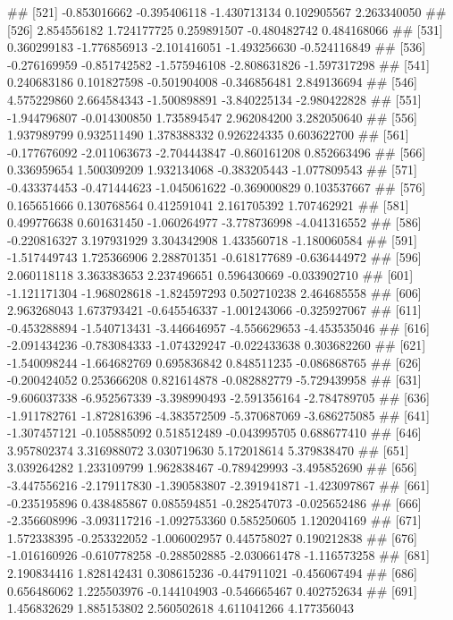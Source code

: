 \documentclass[
]{article}
\begin{document}
\begin{enumerate}[label=(\alph*)]
##  [521] -0.853016662 -0.395406118 -1.430713134  0.102905567  2.263340050
##  [526]  2.854556182  1.724177725  0.259891507 -0.480482742  0.484168066
##  [531]  0.360299183 -1.776856913 -2.101416051 -1.493256630 -0.524116849
##  [536] -0.276169959 -0.851742582 -1.575946108 -2.808631826 -1.597317298
##  [541]  0.240683186  0.101827598 -0.501904008 -0.346856481  2.849136694
##  [546]  4.575229860  2.664584343 -1.500898891 -3.840225134 -2.980422828
##  [551] -1.944796807 -0.014300850  1.735894547  2.962084200  3.282050640
##  [556]  1.937989799  0.932511490  1.378388332  0.926224335  0.603622700
##  [561] -0.177676092 -2.011063673 -2.704443847 -0.860161208  0.852663496
##  [566]  0.336959654  1.500309209  1.932134068 -0.383205443 -1.077809543
##  [571] -0.433374453 -0.471444623 -1.045061622 -0.369000829  0.103537667
##  [576]  0.165651666  0.130768564  0.412591041  2.161705392  1.707462921
##  [581]  0.499776638  0.601631450 -1.060264977 -3.778736998 -4.041316552
##  [586] -0.220816327  3.197931929  3.304342908  1.433560718 -1.180060584
##  [591] -1.517449743  1.725366906  2.288701351 -0.618177689 -0.636444972
##  [596]  2.060118118  3.363383653  2.237496651  0.596430669 -0.033902710
##  [601] -1.121171304 -1.968028618 -1.824597293  0.502710238  2.464685558
##  [606]  2.963268043  1.673793421 -0.645546337 -1.001243066 -0.325927067
##  [611] -0.453288894 -1.540713431 -3.446646957 -4.556629653 -4.453535046
##  [616] -2.091434236 -0.783084333 -1.074329247 -0.022433638  0.303682260
##  [621] -1.540098244 -1.664682769  0.695836842  0.848511235 -0.086868765
##  [626] -0.200424052  0.253666208  0.821614878 -0.082882779 -5.729439958
##  [631] -9.606037338 -6.952567339 -3.398990493 -2.591356164 -2.784789705
##  [636] -1.911782761 -1.872816396 -4.383572509 -5.370687069 -3.686275085
##  [641] -1.307457121 -0.105885092  0.518512489 -0.043995705  0.688677410
##  [646]  3.957802374  3.316988072  3.030719630  5.172018614  5.379838470
##  [651]  3.039264282  1.233109799  1.962838467 -0.789429993 -3.495852690
##  [656] -3.447556216 -2.179117830 -1.390583807 -2.391941871 -1.423097867
##  [661] -0.235195896  0.438485867  0.085594851 -0.282547073 -0.025652486
##  [666] -2.356608996 -3.093117216 -1.092753360  0.585250605  1.120204169
##  [671]  1.572338395 -0.253322052 -1.006002957  0.445758027  0.190212838
##  [676] -1.016160926 -0.610778258 -0.288502885 -2.030661478 -1.116573258
##  [681]  2.190834416  1.828142431  0.308615236 -0.447911021 -0.456067494
##  [686]  0.656486062  1.225503976 -0.144104903 -0.546665467  0.402752634
##  [691]  1.456832629  1.885153802  2.560502618  4.611041266  4.177356043

\end{enumerate}
\end{document}

